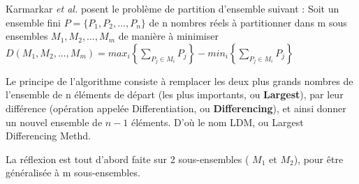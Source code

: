 \documentclass[a4paper,12pt]{report}
\theoremstyle{plain}				%
\theoremstyle{definition}				%
\begin{document}
Karmarkar \textit{et al.} \cite{karmarkar1982differencing} posent le problème de partition d'ensemble suivant :
Soit un ensemble fini $P=\{P_1, P_2, \ldots, P_n\}$ de 
n nombres réels 
à partitionner dans m sous ensembles $M_1, M_2, \ldots, M_m$ 
de manière à minimiser 
$D(M_1, M_2, \ldots, M_m) = max_i \left\{ \sum_{P_j \in M_i}P_j \right\} - min_i \left\{ \sum_{P_j \in M_i}P_j \right\}$  

Le principe de l'algorithme consiste à remplacer les deux plus grands nombres de l'ensemble de n éléments de départ 
(les plus importants, ou \textbf{Largest}), 
par leur différence 
(opération appelée Differentiation, ou \textbf{Differencing}), 
et ainsi donner un nouvel ensemble de $n-1$ éléments. 
D'où le nom LDM, ou Largest Differencing Methd.


La réflexion est tout d'abord faite sur 2 sous-ensembles ( $M_1$ et $M_2$), pour être généralisée à m sous-ensembles.
\end{document}
